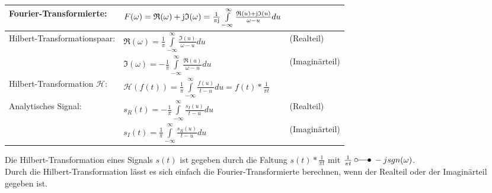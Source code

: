 			\begin{tabular}{| l | l l |}
				\hline
					Fourier-Transformierte: & $F(\omega) = \mathfrak{R}(\omega) + \im \mathfrak{I}(\omega)
					= \frac{1}{\pi \im} \int\limits_{-\infty}^{\infty}\frac{\mathfrak{R}(u) + \im \mathfrak{I}(u)}{\omega - u} du$ & \\
				\hline
					Hilbert-Transformationspaar: & $\mathfrak{R}(\omega) = \frac{1}{\pi} \int\limits_{-\infty}^{\infty} \frac{\mathfrak{I}(u)}{\omega - u} du$ & (Realteil)\\
					& $\mathfrak{I}(\omega) = -\frac{1}{\pi} \int\limits_{-\infty}^{\infty} \frac{\mathfrak{R}(u)}{\omega - u} du$ & (Imaginärteil)\\
				\hline
					Hilbert-Transformation $\mathcal{H}$: & $\mathcal{H}(f(t)) = \frac{1}{\pi} \int\limits_{-\infty}^{\infty} \frac{f(u)}{t-u} du
					= f(t) * \frac{1}{\pi t}$ & \\
				\hline
					Analytisches Signal: & $s_R(t) = - \frac{1}{\pi} \int\limits_{-\infty}^{\infty} \frac{s_I(u)}{t-u} du$ & (Realteil)\\
					& $s_I(t) = \frac{1}{\pi} \int\limits_{-\infty}^{\infty} \frac{s_R(u)}{t-u} du$ & (Imaginärteil)\\
				\hline
			\end{tabular}
		
			Die Hilbert-Transformation eines Signals $s(t)$ ist gegeben durch die Faltung $s(t) * \frac{1}{\pi t}$ mit $\frac{1}{\pi t} \; \laplace \; -j sgn(\omega)$.\\
			Durch die Hilbert-Transformation lässt es sich einfach die Fourier-Transformierte berechnen, wenn der Realteil oder der Imaginärteil gegeben
			ist.
			